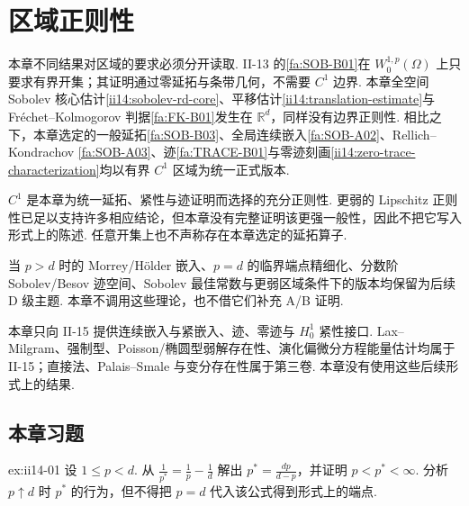 \section{区域正则性}\label{sec:ii14-domain-regularity}

本章不同结果对区域的要求必须分开读取. II-13 的\autoref{fa:SOB-B01}在 \(\displaystyle W_0^{1,p}(\Omega)\) 上只要求有界开集；其证明通过零延拓与条带几何，不需要 \(\displaystyle C^1\) 边界. 本章全空间 Sobolev 核心估计\autoref{ii14:sobolev-rd-core}、平移估计\autoref{ii14:translation-estimate}与 Fréchet--Kolmogorov 判据\autoref{fa:FK-B01}发生在 \(\displaystyle\mathbb R^d\)，同样没有边界正则性. 相比之下，本章选定的一般延拓\autoref{fa:SOB-B03}、全局连续嵌入\autoref{fa:SOB-A02}、Rellich--Kondrachov \autoref{fa:SOB-A03}、迹\autoref{fa:TRACE-B01}与零迹刻画\autoref{ii14:zero-trace-characterization}均以有界 \(\displaystyle C^1\) 区域为统一正式版本.

\begin{FARemark}[选定的正则性不是必要性结论]
\(\displaystyle C^1\) 是本章为统一延拓、紧性与迹证明而选择的充分正则性. 更弱的 Lipschitz 正则性已足以支持许多相应结论，但本章没有完整证明该更强一般性，因此不把它写入形式上的陈述. 任意开集上也不声称存在本章选定的延拓算子.
\end{FARemark}

\begin{FARemark}
当 \(\displaystyle p>d\) 时的 Morrey/Hölder 嵌入、\(\displaystyle p=d\) 的临界端点精细化、分数阶 Sobolev/Besov 迹空间、Sobolev 最佳常数与更弱区域条件下的版本均保留为后续 D 级主题. 本章不调用这些理论，也不借它们补充 A/B 证明.
\end{FARemark}

\begin{FAWarning}[II-15 与第三卷的前向边界]
本章只向 II-15 提供连续嵌入与紧嵌入、迹、零迹与 \(\displaystyle H_0^1\) 紧性接口. Lax--Milgram、强制型、Poisson/椭圆型弱解存在性、演化偏微分方程能量估计均属于 II-15；直接法、Palais--Smale 与变分存在性属于第三卷. 本章没有使用这些后续形式上的结果.
\end{FAWarning}

\subsection*{本章习题}\label{sec:ii14-exercises}

\begin{FAExercise}[临界指数代数计算]{ex:ii14-01}
设 \(\displaystyle1\leqslant p<d\). 从 \(\displaystyle\frac{1}{p^*}=\frac{1}{p}-\frac{1}{d}\) 解出 \(\displaystyle p^*=\frac{dp}{d-p}\)，并证明 \(\displaystyle p<p^*<\infty\). 分析 \(\displaystyle p\uparrow d\) 时 \(\displaystyle p^*\) 的行为，但不得把 \(\displaystyle p=d\) 代入该公式得到形式上的端点.
\end{FAExercise}

